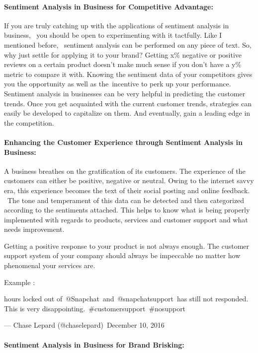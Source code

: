 \documentclass{article} %
\begin{document}
\paragraph{Sentiment Analysis in Business for Competitive Advantage:}

\noindent            If you are truly catching up with the applications of sentiment analysis in business, ~you should be open to experimenting with it tactfully. Like I mentioned before, ~sentiment analysis can be performed on any piece of text. So, why just settle for applying it to your brand? Getting x\% negative or positive reviews on a certain product doesn't make much sense if you don't have a y\% metric to compare it with. Knowing the sentiment data of your competitors gives you the opportunity as well as the~incentive to perk up your performance. Sentiment analysis in businesses can be very helpful in predicting the customer trends. Once you get acquainted with the current customer trends, strategies can easily be developed to capitalize on them. And eventually, gain a leading edge in the competition.


\paragraph{Enhancing the Customer Experience through Sentiment Analysis in Business:}

\noindent         A business breathes on the gratification of its customers. The experience of the customers can either be positive, negative or neutral. Owing to the internet savvy era, this experience becomes the text of their social posting and online feedback. ~The tone and temperament of this data can be detected and then categorized according to the sentiments attached. This helps to know what is being properly implemented with regards to products, services and customer support and what needs improvement.

\noindent           Getting a positive response to your product is not always enough. The customer support system of your company should always be impeccable no matter how phenomenal your services are.

\noindent Example :

 hours locked out of~@Snapchat~and~@snapchatsupport~has still not responded. This is very disappointing.~\#customersupport~\#nosupport

--- Chase Lepard (@chaselepard)~December 10, 2016


\paragraph{Sentiment Analysis in Business for Brand Brisking:}
\end{document}
